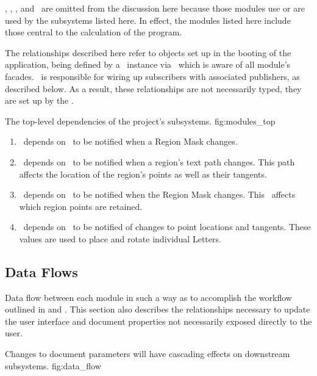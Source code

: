 \docmod, \uimod, \permod, and \bmmod\ are omitted from the discussion here because those modules use or are used by the subsystems listed here.
In effect, the modules listed here include those central to the calculation of the program.

The relationships described here refer to objects set up in the booting of the application, being defined by a \sysfact\ instance via \sysbldr\ which is aware of all module's facades.
\sysbldr\ is responsible for wiring up subscribers with associated publishers, as described below.
As a result, these relationships are not necessarily typed, they are set up by the \sysfact.

{The top-level dependencies of the project's subsystems.}
{fig:modules_top}
{\diagsize}

\begin{enumerate}
      \item \linemod\ depends on \regmod\ to be notified when a Region Mask changes.
      \item \ptmod\ depends on \linemod\ to be notified when a region's text path changes.  This path affects the location of the region's points as well as their tangents.
      \item \ptmod\ depends on \regmod\ to be notified when the Region Mask changes.  This \bmtype\ affects which region points are retained.
      \item {}\ depends on \ptmod\ to be notified of changes to point locations and tangents.  These values are used to place and rotate individual Letters.
\end{enumerate}




\subsection{Data Flows}
\label{sec:dataflows}
Data flow between each module in such a way as to accomplish the workflow outlined in  and .
This section also describes the relationships necessary to update the user interface and document properties not necessarily exposed directly to the user.

{Changes to document parameters will have cascading effects on downstream subsystems.}
{fig:data_flow}

